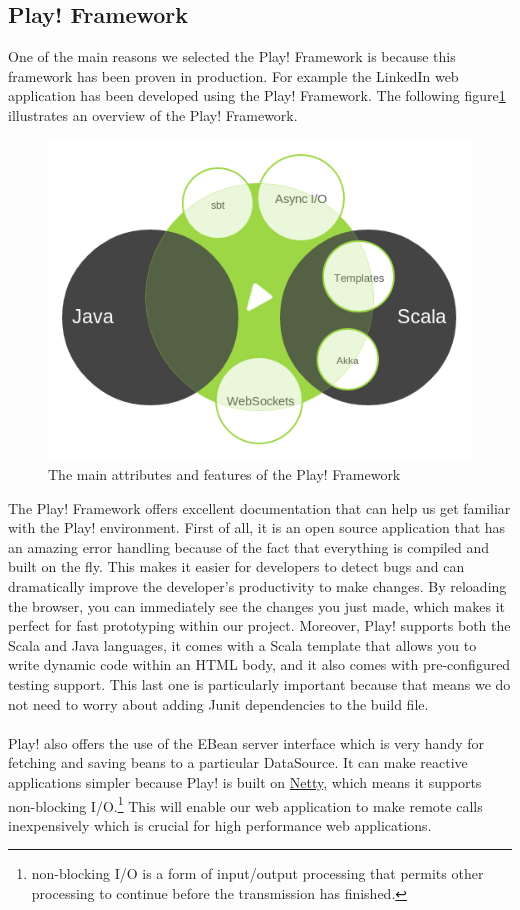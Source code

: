 \subsection{Play! Framework}
  One of the main reasons we selected the Play! Framework is because this framework has been proven in production. For example the LinkedIn web application has been developed using the Play! Framework. The following figure\ref{play} illustrates an overview of the Play! Framework.\\
\begin{figure}[h!]
\centering
\includegraphics[scale=0.5]{./img/play.png}
\caption{\small{The main attributes and features of the Play! Framework}}
\label{play}
\end{figure}
 
 
The Play! Framework offers excellent documentation\cite{playDoc} that can help us get familiar with the Play! environment. First of all, it is an open source application that has an amazing error handling because of the fact that everything is compiled and built on the fly. This makes it easier for developers to detect bugs and can dramatically improve the developer's productivity to make changes. By reloading the browser, you can immediately see the changes you just made, which makes it perfect for fast prototyping within our project. Moreover, Play! supports both the Scala and Java languages, it comes with a Scala template that allows you to write dynamic code within an HTML body, and it also comes with pre-configured testing support. This last one is particularly important because that means we do not need to worry about adding Junit dependencies to the build file. \\\\
Play! also offers the use of the EBean server interface which is very handy for fetching and saving beans to a particular DataSource. It can make reactive applications simpler because Play! is built on \href{http://netty.io/}{Netty}, which means it supports non-blocking I/O.\footnote{ non-blocking I/O is a form of input/output processing that permits other processing to continue before the transmission has finished.} This will enable our web application to make remote calls inexpensively which is crucial for high performance web applications.





